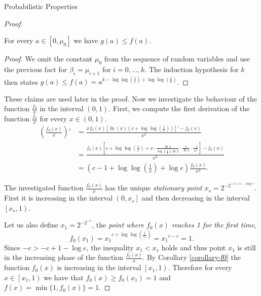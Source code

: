 \begin{section}{Probabilistic Properties}
\begin{proof}
\begin{claim}
\label{claim-estimate-g}
For every $a \in \left[0, \mu_0 \right]$ we have $g(a) \leq f(a)$.
\end{claim}
\begin{proof}
We omit the constant $\mu_0$ from the sequence of random variables and use the previous fact for $\beta_{i} = \mu_{i + 1}$ for $i = 0, \dots, k$. The induction hypothesis for $k$ then states $g(a) \leq f(a) = a^{k - \log \log \left(\frac{1}{t}\right) + \log \log \left(\frac{1}{a}\right)}$. 
\end{proof}

These claims are used later in the proof. Now we investigate the behaviour of the function $\frac{f_0}{x}$ in the interval $(0, 1)$. First, we compute the first derivation of the function $\frac{f_0}{x}$ for every $x \in (0, 1)$.
\[
\begin{split}
\left(\frac{f_0(x)}{x}\right)' 
	& = \frac{xf_0(x)\left[\ln(x)\left(c + \log \log \left(\frac{1}{x}\right)\right)\right]' - f_0(x)}{x^2} \\
	& = \frac{f_0(x)\left[c + \log \log \left(\frac{1}{x}\right) + x \cdot \frac{\ln x}{\log\left(\frac{1}{x}\right) \ln 2}\cdot\frac{x}{\ln 2}\cdot\frac{-1}{x ^ 2} \right] - f_0(x)}{x^2} \\
	& = \left(c - 1 + \log \log \left( \frac{1}{x} \right) + \log e \right)\frac{f_0(x)}{x^2} \text{.}
\end{split}
\]

The investigated function $\frac{f_0(x)}{x}$ has the unique \emph{stationary point} $x_s = 2 ^ {-2 ^ {-c + 1 - \log e}}$. First it is increasing in the interval $\left(0, x_s \right]$ and then decreasing in the interval $\left[x_s, 1\right)$. 

Let us also define $x_1 = 2 ^ {-2 ^ {-c}}$, the \emph{point where $f_0(x)$ reaches 1 for the first time},
\[
f_0(x_1) = {x_1} ^ {c + \log \log \left(\frac{1}{x_1}\right)} = {x_1} ^ {c - c} = 1 \text{.}
\]
Since $-c > -c + 1 -\log e$, the inequality $x_1 < x_s$ holds and thus point $x_1$ is still in the increasing phase of the function $\frac{f_0(x)}{x}$.
By Corollary \ref{corollary-f0} the function $f_0(x)$ is increasing in the interval $\left[x_1, 1\right)$. Therefore for every $x \in \left[x_1, 1\right)$ we have that $f_0(x) \geq f_0(x_1) = 1$ and $f(x) = \min \{1, f_0(x)\} = 1$.


\end{proof}
\end{section}
